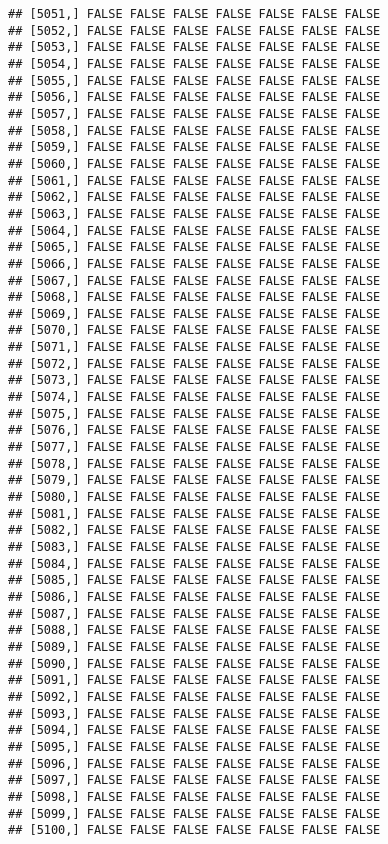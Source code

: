 \documentclass[
]{article}
\begin{document}
\begin{verbatim}
## [5051,] FALSE FALSE FALSE FALSE FALSE FALSE FALSE
## [5052,] FALSE FALSE FALSE FALSE FALSE FALSE FALSE
## [5053,] FALSE FALSE FALSE FALSE FALSE FALSE FALSE
## [5054,] FALSE FALSE FALSE FALSE FALSE FALSE FALSE
## [5055,] FALSE FALSE FALSE FALSE FALSE FALSE FALSE
## [5056,] FALSE FALSE FALSE FALSE FALSE FALSE FALSE
## [5057,] FALSE FALSE FALSE FALSE FALSE FALSE FALSE
## [5058,] FALSE FALSE FALSE FALSE FALSE FALSE FALSE
## [5059,] FALSE FALSE FALSE FALSE FALSE FALSE FALSE
## [5060,] FALSE FALSE FALSE FALSE FALSE FALSE FALSE
## [5061,] FALSE FALSE FALSE FALSE FALSE FALSE FALSE
## [5062,] FALSE FALSE FALSE FALSE FALSE FALSE FALSE
## [5063,] FALSE FALSE FALSE FALSE FALSE FALSE FALSE
## [5064,] FALSE FALSE FALSE FALSE FALSE FALSE FALSE
## [5065,] FALSE FALSE FALSE FALSE FALSE FALSE FALSE
## [5066,] FALSE FALSE FALSE FALSE FALSE FALSE FALSE
## [5067,] FALSE FALSE FALSE FALSE FALSE FALSE FALSE
## [5068,] FALSE FALSE FALSE FALSE FALSE FALSE FALSE
## [5069,] FALSE FALSE FALSE FALSE FALSE FALSE FALSE
## [5070,] FALSE FALSE FALSE FALSE FALSE FALSE FALSE
## [5071,] FALSE FALSE FALSE FALSE FALSE FALSE FALSE
## [5072,] FALSE FALSE FALSE FALSE FALSE FALSE FALSE
## [5073,] FALSE FALSE FALSE FALSE FALSE FALSE FALSE
## [5074,] FALSE FALSE FALSE FALSE FALSE FALSE FALSE
## [5075,] FALSE FALSE FALSE FALSE FALSE FALSE FALSE
## [5076,] FALSE FALSE FALSE FALSE FALSE FALSE FALSE
## [5077,] FALSE FALSE FALSE FALSE FALSE FALSE FALSE
## [5078,] FALSE FALSE FALSE FALSE FALSE FALSE FALSE
## [5079,] FALSE FALSE FALSE FALSE FALSE FALSE FALSE
## [5080,] FALSE FALSE FALSE FALSE FALSE FALSE FALSE
## [5081,] FALSE FALSE FALSE FALSE FALSE FALSE FALSE
## [5082,] FALSE FALSE FALSE FALSE FALSE FALSE FALSE
## [5083,] FALSE FALSE FALSE FALSE FALSE FALSE FALSE
## [5084,] FALSE FALSE FALSE FALSE FALSE FALSE FALSE
## [5085,] FALSE FALSE FALSE FALSE FALSE FALSE FALSE
## [5086,] FALSE FALSE FALSE FALSE FALSE FALSE FALSE
## [5087,] FALSE FALSE FALSE FALSE FALSE FALSE FALSE
## [5088,] FALSE FALSE FALSE FALSE FALSE FALSE FALSE
## [5089,] FALSE FALSE FALSE FALSE FALSE FALSE FALSE
## [5090,] FALSE FALSE FALSE FALSE FALSE FALSE FALSE
## [5091,] FALSE FALSE FALSE FALSE FALSE FALSE FALSE
## [5092,] FALSE FALSE FALSE FALSE FALSE FALSE FALSE
## [5093,] FALSE FALSE FALSE FALSE FALSE FALSE FALSE
## [5094,] FALSE FALSE FALSE FALSE FALSE FALSE FALSE
## [5095,] FALSE FALSE FALSE FALSE FALSE FALSE FALSE
## [5096,] FALSE FALSE FALSE FALSE FALSE FALSE FALSE
## [5097,] FALSE FALSE FALSE FALSE FALSE FALSE FALSE
## [5098,] FALSE FALSE FALSE FALSE FALSE FALSE FALSE
## [5099,] FALSE FALSE FALSE FALSE FALSE FALSE FALSE
## [5100,] FALSE FALSE FALSE FALSE FALSE FALSE FALSE

\end{verbatim}
\end{document}
